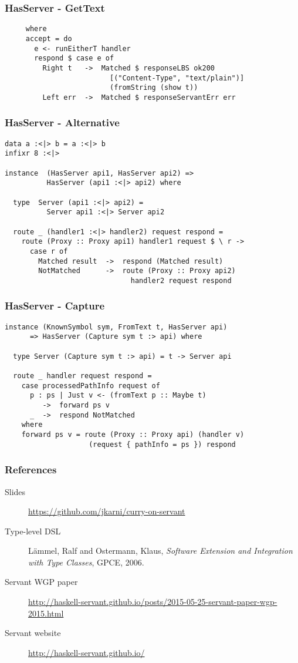 \documentclass{beamer}
\begin{document}
\begin{frame}[fragile]
\frametitle{HasServer - GetText}
\begin{verbatim}
     where
     accept = do
       e <- runEitherT handler
       respond $ case e of
         Right t   ->  Matched $ responseLBS ok200
                         [("Content-Type", "text/plain")]
                         (fromString (show t))
         Left err  ->  Matched $ responseServantErr err
\end{verbatim}
\end{frame}

\begin{frame}[fragile]
\frametitle{HasServer - Alternative}
\begin{verbatim}
data a :<|> b = a :<|> b
infixr 8 :<|>

instance  (HasServer api1, HasServer api2) =>
          HasServer (api1 :<|> api2) where

  type  Server (api1 :<|> api2) =
          Server api1 :<|> Server api2

  route _ (handler1 :<|> handler2) request respond =
    route (Proxy :: Proxy api1) handler1 request $ \ r ->
      case r of
        Matched result  ->  respond (Matched result)
        NotMatched      ->  route (Proxy :: Proxy api2)
                              handler2 request respond
\end{verbatim}
\end{frame}


\begin{frame}[fragile]
    \frametitle{HasServer - Capture}
    \pause 
\begin{verbatim}
instance (KnownSymbol sym, FromText t, HasServer api)
      => HasServer (Capture sym t :> api) where

  type Server (Capture sym t :> api) = t -> Server api

  route _ handler request respond =
    case processedPathInfo request of
      p : ps | Just v <- (fromText p :: Maybe t)
         ->  forward ps v
      _  ->  respond NotMatched
    where
    forward ps v = route (Proxy :: Proxy api) (handler v)
                    (request { pathInfo = ps }) respond
  \end{verbatim}
\end{frame}

\begin{frame}
\frametitle{References}
\begin{description}

\item[Slides] 
    \url{https://github.com/jkarni/curry-on-servant}
\item[Type-level DSL] L\"{a}mmel, Ralf and Ostermann, Klaus,
\textit{Software Extension and Integration with Type Classes}, GPCE, 2006.
\item[Servant WGP paper]
\url{http://haskell-servant.github.io/posts/2015-05-25-servant-paper-wgp-2015.html}
\item[Servant website] \url{http://haskell-servant.github.io/}
\end{description}
\end{frame}
\end{document}
